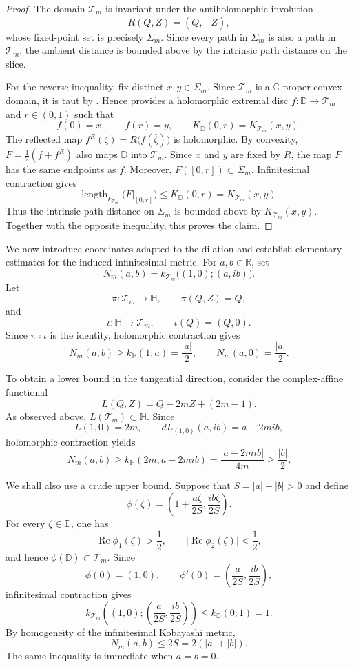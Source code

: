 \documentclass[11pt]{article}
\theoremstyle{definition}
\begin{document}
\begin{proof}
The domain $\mathcal T_m$ is invariant under the antiholomorphic involution
\[
 R(Q,Z)=(\overline Q,-\overline Z),
\]
whose fixed-point set is precisely $\Sigma_m$. Since every path in
$\Sigma_m$ is also a path in $\mathcal T_m$, the ambient distance is bounded
above by the intrinsic path distance on the slice.

For the reverse inequality, fix distinct $x,y\in\Sigma_m$. Since
$\mathcal T_m$ is a $\mathbb C$-proper convex domain, it is taut by
\cite[Theorem~1.1]{BracciSaracco}. Hence
\cite[Lemma~3.3]{BracciSaracco} provides a holomorphic extremal disc
$f:\mathbb D\to\mathcal T_m$ and $r\in(0,1)$ such that
\[
 f(0)=x,
 \qquad
 f(r)=y,
 \qquad
 K_{\mathbb D}(0,r)=K_{\mathcal T_m}(x,y).
\]
The reflected map
\(
 f^R(\zeta)=R\bigl(f(\overline\zeta)\bigr)
\)
is holomorphic. By convexity,
\(
 F=\tfrac12(f+f^R)
\)
also maps $\mathbb D$ into $\mathcal T_m$. Since $x$ and $y$ are fixed by
$R$, the map $F$ has the same endpoints as $f$. Moreover,
$F([0,r])\subset\Sigma_m$. Infinitesimal contraction gives
\[
 \operatorname{length}_{k_{\mathcal T_m}}\bigl(F|_{[0,r]}\bigr)
 \leq K_{\mathbb D}(0,r)
 =K_{\mathcal T_m}(x,y).
\]
Thus the intrinsic path distance on $\Sigma_m$ is bounded above by
$K_{\mathcal T_m}(x,y)$. Together with the opposite inequality, this proves
the claim.
\end{proof}

We now introduce coordinates adapted to the dilation and establish elementary
estimates for the induced infinitesimal metric. For $a,b\in\mathbb R$, set
\[
 N_m(a,b)=k_{\mathcal T_m}\bigl((1,0);(a,ib)\bigr).
\]
Let
\[
 \pi:\mathcal T_m\to\mathbb H,
 \qquad \pi(Q,Z)=Q,
\]
and
\[
 \iota:\mathbb H\to\mathcal T_m,
 \qquad \iota(Q)=(Q,0).
\]
Since $\pi\circ\iota$ is the identity, holomorphic contraction gives
\[
 N_m(a,b)\geq k_{\mathbb H}(1;a)=\frac{|a|}{2},
 \qquad
 N_m(a,0)=\frac{|a|}{2}.
\]

To obtain a lower bound in the tangential direction, consider the
complex-affine functional
\[
 L(Q,Z)=Q-2mZ+(2m-1).
\]
As observed above, $L(\mathcal T_m)\subset\mathbb H$. Since
\[
 L(1,0)=2m,
 \qquad
 dL_{(1,0)}(a,ib)=a-2mib,
\]
holomorphic contraction yields
\[
 N_m(a,b)
 \geq k_{\mathbb H}(2m;a-2mib)
 =\frac{|a-2mib|}{4m}
 \geq\frac{|b|}{2}.
\]

We shall also use a crude upper bound. Suppose that $S=|a|+|b|>0$ and
define
\[
 \phi(\zeta)
 =
 \left(1+\frac{a\zeta}{2S},\frac{ib\zeta}{2S}\right).
\]
For every $\zeta\in\mathbb D$, one has
\[
 \operatorname{Re}\phi_1(\zeta)>\frac12,
 \qquad
 \bigl|\operatorname{Re}\phi_2(\zeta)\bigr|<\frac12,
\]
and hence $\phi(\mathbb D)\subset\mathcal T_m$. Since
\[
 \phi(0)=(1,0),
 \qquad
 \phi'(0)=\left(\frac{a}{2S},\frac{ib}{2S}\right),
\]
infinitesimal contraction gives
\[
 k_{\mathcal T_m}\left((1,0);
 \left(\frac{a}{2S},\frac{ib}{2S}\right)\right)
 \leq k_{\mathbb D}(0;1)=1.
\]
By homogeneity of the infinitesimal Kobayashi metric,
\[
 N_m(a,b)\leq2S=2(|a|+|b|).
\]
The same inequality is immediate when $a=b=0$.
\end{document}

